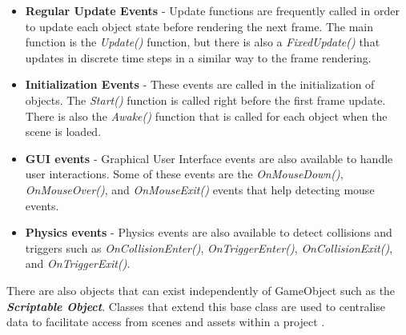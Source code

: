 \begin{itemize}
    \item \textbf{Regular Update Events} - Update functions are frequently called in order to update each object state before rendering the next frame. The main function is the \textit{Update()} function, but there is also a \textit{FixedUpdate()} that updates in discrete time steps in a similar way to the frame rendering.

    \item \textbf{Initialization Events} - These events are called in the initialization of objects. The \textit{Start()} function is called right before the first frame update. There is also the \textit{Awake()} function that is called for each object when the scene is loaded. 
    
    \item \textbf{GUI events} - Graphical User Interface events are also available to handle user interactions. Some of these events are the \textit{OnMouseDown()}, \textit{OnMouseOver()}, and \textit{OnMouseExit()} events that help detecting mouse events.
    
    \item \textbf{Physics events} - Physics events are also available to detect collisions and triggers such as \textit{OnCollisionEnter()}, \textit{OnTriggerEnter()}, \textit{OnCollisionExit()}, and \textit{OnTriggerExit()}.
\end{itemize}


There are also objects that can exist independently of GameObject such as the \textbf{\textit{Scriptable Object}}. Classes that extend this base class are used to centralise data to facilitate access from scenes and assets within a project \cite{unityDocScriptableObj}.



